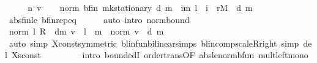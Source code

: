 \begin{isabellebody}
%
\isatagproof
{}\isamarkupfalse%
\ {\isacharminus}{\kern0pt}\isanewline
\ \ \isamarkupfalse%
\ n\ v\isanewline
\ \ \isamarkupfalse%
\ {\isachardoublequoteopen}norm\ {\isacharparenleft}{\kern0pt}{\isasymnu}\isactrlsub b{\isacharunderscore}{\kern0pt}fin\ {\isacharparenleft}{\kern0pt}mk{\isacharunderscore}{\kern0pt}stationary\ d{\isacharparenright}{\kern0pt}\ m{\isacharparenright}{\kern0pt}\ {\isasymle}\ {\isacharparenleft}{\kern0pt}{\isasymSum}i{\isacharless}{\kern0pt}m{\isachardot}{\kern0pt}\ l\ {\isacharcircum}{\kern0pt}\ i\ {\isacharasterisk}{\kern0pt}\ r\isactrlsub M{\isacharparenright}{\kern0pt}{\isachardoublequoteclose}\ \ d\ m\isanewline
\ \ \ \ \isamarkupfalse%
\ abs{\isacharunderscore}{\kern0pt}{\isasymnu}{\isacharunderscore}{\kern0pt}fin{\isacharunderscore}{\kern0pt}le\ {\isasymnu}\isactrlsub b{\isacharunderscore}{\kern0pt}fin{\isachardot}{\kern0pt}rep{\isacharunderscore}{\kern0pt}eq\isanewline
\ \ \ \ \isamarkupfalse%
\ {\isacharparenleft}{\kern0pt}auto\ intro{\isacharbang}{\kern0pt}{\isacharcolon}{\kern0pt}\ norm{\isacharunderscore}{\kern0pt}bound{\isacharparenright}{\kern0pt}\isanewline
\ \ \isamarkupfalse%
\ \isamarkupfalse%
\ {\isachardoublequoteopen}norm\ {\isacharparenleft}{\kern0pt}{\isacharparenleft}{\kern0pt}{\isacharparenleft}{\kern0pt}l\ {\isacharasterisk}{\kern0pt}\isactrlsub R\ {\isasymP}\ d{\isacharparenright}{\kern0pt}{\isacharcircum}{\kern0pt}{\isacharcircum}{\kern0pt}m{\isacharparenright}{\kern0pt}\ v{\isacharparenright}{\kern0pt}\ {\isasymle}\ l\ {\isacharcircum}{\kern0pt}\ m\ {\isacharasterisk}{\kern0pt}\ norm\ v{\isachardoublequoteclose}\ \ d\ m\isanewline
\ \ \ \ \isamarkupfalse%
\ {\isacharparenleft}{\kern0pt}auto\ simp{\isacharcolon}{\kern0pt}\ {\isasymP}\isactrlsub X{\isacharunderscore}{\kern0pt}const{\isacharbrackleft}{\kern0pt}symmetric{\isacharbrackright}{\kern0pt}\ blinfun{\isachardot}{\kern0pt}bilinear{\isacharunderscore}{\kern0pt}simps\ blincomp{\isacharunderscore}{\kern0pt}scaleR{\isacharunderscore}{\kern0pt}right\ simp\ del{\isacharcolon}{\kern0pt}\ {\isasymP}\isactrlsub X{\isacharunderscore}{\kern0pt}sconst\ \isanewline
\ \ \ \ \ \ \ \ intro{\isacharbang}{\kern0pt}{\isacharcolon}{\kern0pt}\ boundedI\ order{\isachardot}{\kern0pt}trans{\isacharbrackleft}{\kern0pt}OF\ abs{\isacharunderscore}{\kern0pt}le{\isacharunderscore}{\kern0pt}norm{\isacharunderscore}{\kern0pt}bfun{\isacharbrackright}{\kern0pt}\ mult{\isacharunderscore}{\kern0pt}left{\isacharunderscore}{\kern0pt}mono{\isacharparenright}{\kern0pt}\isanewline

\end{isabellebody}

